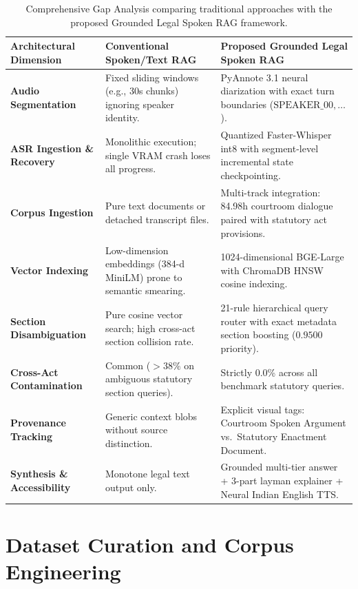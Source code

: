\documentclass{llncs}
\begin{document}
\begin{table}[htbp]
\caption{Comprehensive Gap Analysis comparing traditional approaches with the proposed Grounded Legal Spoken RAG framework.}
\label{tab:gap_analysis_extended}
\centering
\scriptsize
\begin{tabularx}{\textwidth}{lXX}
\toprule
\textbf{Architectural Dimension} & \textbf{Conventional Spoken/Text RAG} & \textbf{Proposed Grounded Legal Spoken RAG} \\
\midrule
\textbf{Audio Segmentation} & Fixed sliding windows (e.g., 30s chunks) ignoring speaker identity. & PyAnnote 3.1 neural diarization with exact turn boundaries ($\text{SPEAKER\_00}, \dots$). \\
\addlinespace
\textbf{ASR Ingestion \& Recovery} & Monolithic execution; single VRAM crash loses all progress. & Quantized Faster-Whisper int8 with segment-level incremental state checkpointing. \\
\addlinespace
\textbf{Corpus Ingestion} & Pure text documents or detached transcript files. & Multi-track integration: 84.98h courtroom dialogue paired with statutory act provisions. \\
\addlinespace
\textbf{Vector Indexing} & Low-dimension embeddings (384-d MiniLM) prone to semantic smearing. & 1024-dimensional BGE-Large with ChromaDB HNSW cosine indexing. \\
\addlinespace
\textbf{Section Disambiguation} & Pure cosine vector search; high cross-act section collision rate. & 21-rule hierarchical query router with exact metadata section boosting ($0.9500$ priority). \\
\addlinespace
\textbf{Cross-Act Contamination} & Common ($>38\%$ on ambiguous statutory section queries). & Strictly 0.0\% across all benchmark statutory queries. \\
\addlinespace
\textbf{Provenance Tracking} & Generic context blobs without source distinction. & Explicit visual tags: Courtroom Spoken Argument vs.\ Statutory Enactment Document. \\
\addlinespace
\textbf{Synthesis \& Accessibility} & Monotone legal text output only. & Grounded multi-tier answer + 3-part layman explainer + Neural Indian English TTS. \\
\bottomrule
\end{tabularx}
\end{table}


\section{Dataset Curation and Corpus Engineering}
\label{sec:dataset}
\end{document}
